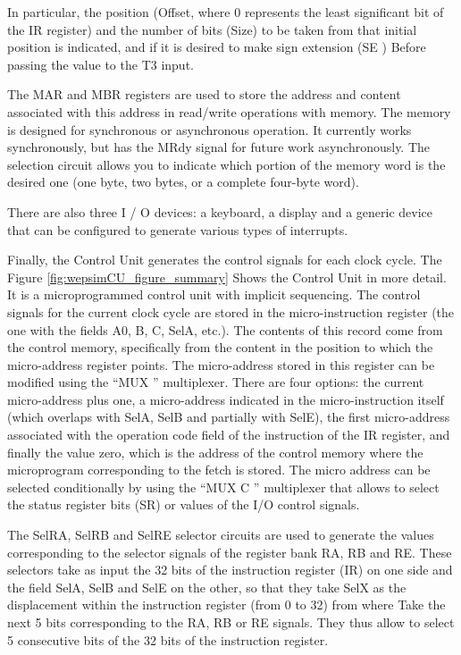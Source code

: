 In particular, the position (Offset, where 0 represents the least significant bit of the IR register) and the number of bits (Size) to be taken from that initial position is indicated, and if it is desired to make sign extension (SE ) Before passing the value to the T3 input.

The MAR and MBR registers are used to store the address and content associated with this address in read/write operations with memory. The memory is designed for synchronous or asynchronous operation. It currently works synchronously, but has the MRdy signal for future work asynchronously. The selection circuit allows you to indicate which portion of the memory word is the desired one (one byte, two bytes, or a complete four-byte word).

There are also three I / O devices: a keyboard, a display and a generic device that can be configured to generate various types of interrupts.

Finally, the Control Unit generates the control signals for each clock cycle. The Figure \ref{fig:wepsimCU_figure_summary} Shows the Control Unit in more detail. It is a microprogrammed control unit with implicit sequencing. The control signals for the current clock cycle are stored in the micro-instruction register (the one with the fields A0, B, C, SelA, etc.). The contents of this record come from the control memory, specifically from the content in the position to which the micro-address register points. The micro-address stored in this register can be modified using the ``MUX '' multiplexer. There are four options: the current micro-address plus one, a micro-address indicated in the micro-instruction itself (which overlaps with SelA, SelB and partially with SelE), the first micro-address associated with the operation code field of the instruction of the IR register, and finally the value zero, which is the address of the control memory where the microprogram corresponding to the fetch is stored. The micro address can be selected conditionally by using the ``MUX C '' multiplexer that allows to select the status register bits (SR) or values of the I/O control signals. 

The SelRA, SelRB and SelRE selector circuits are used to generate the values corresponding to the selector signals of the register bank RA, RB and RE. These selectors take as input the 32 bits of the instruction register (IR) on one side and the field SelA, SelB and SelE on the other, so that they take SelX as the displacement within the instruction register (from 0 to 32) from where Take the next 5 bits corresponding to the RA, RB or RE signals. They thus allow to select 5 consecutive bits of the 32 bits of the instruction register.

